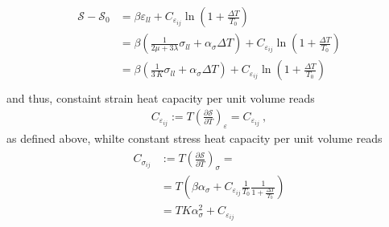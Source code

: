\documentclass[letterpaper,10pt,english]{jupyterBook}
\begin{document}
\begin{equation*}
\begin{split}\begin{aligned}
  \mathcal{S} - \mathcal{S}_0
  & = \beta \varepsilon_{ll} + C_{\varepsilon_{ij}} \ln \left( 1 + \frac{\Delta T}{T_0} \right) \\
  & = \beta \left( \frac{1}{2\mu+3\lambda} \sigma_{ll} + \alpha_{\sigma} \Delta T \right) + C_{\varepsilon_{ij}} \ln \left( 1 + \frac{\Delta T}{T_0} \right) \\
  & = \beta \left( \frac{1}{3 \, K} \sigma_{ll} + \alpha_{\sigma} \Delta T \right) + C_{\varepsilon_{ij}} \ln \left( 1 + \frac{\Delta T}{T_0} \right) \\
\end{aligned}\end{split}
\end{equation*}
\sphinxAtStartPar
and thus, constaint strain heat capacity per unit volume reads
\begin{equation*}
\begin{split}C_{\varepsilon_{ij}} := T \left( \frac{\partial \mathcal{S}}{\partial T} \right)_{\varepsilon} = C_{\varepsilon_{ij}} \ ,\end{split}
\end{equation*}
\sphinxAtStartPar
as defined above, whilte constant stress heat capacity per unit volume reads
\begin{equation*}
\begin{split}\begin{aligned}
  C_{\sigma_{ij}}
  & := T \left( \frac{\partial \mathcal{S}}{\partial T} \right)_{\sigma} = \\
  &  = T \left( \beta \alpha_{\sigma} + C_{\varepsilon_{ij}} \frac{1}{T_0} \frac{1}{1 + \frac{\Delta T}{T_0}} \right) \\
  &  = T K \alpha^2_{\sigma} + C_{\varepsilon_{ij}} \\
\end{aligned}\end{split}
\end{equation*}
\sphinxAtStartPar
{}  
\end{document}
